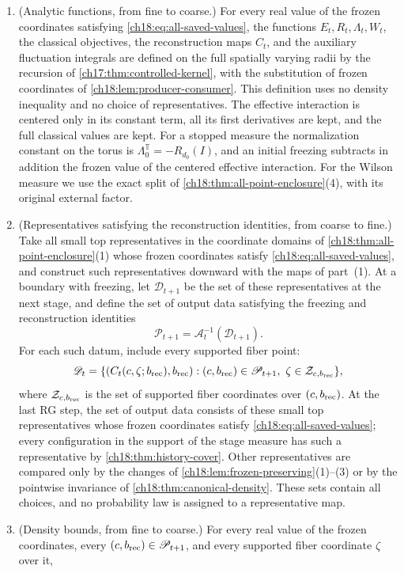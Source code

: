 \begin{theorem}
\begin{enumerate}
\item (Analytic functions, from fine to coarse.) For every real value of the frozen coordinates satisfying \eqref{ch18:eq:all-saved-values}, the functions $E_t,R_t,\Lambda_t,W_t$, the classical objectives, the reconstruction maps $C_t$, and the auxiliary fluctuation integrals are defined on the full spatially varying radii by the recursion of \cref{ch17:thm:controlled-kernel}, with the substitution of frozen coordinates of \cref{ch18:lem:producer-consumer}. This definition uses no density inequality and no choice of representatives. The effective interaction is centered only in its constant term, all its first derivatives are kept, and the full classical values are kept. For a stopped measure the normalization constant on the torus is $\Lambda_0^{\mathbb T}=-R_{d_0}(I)$, and an initial freezing subtracts in addition the frozen value of the centered effective interaction. For the Wilson measure we use the exact split of \cref{ch18:thm:all-point-enclosure}(4), with its original external factor.
\item (Representatives satisfying the reconstruction identities, from coarse to fine.) Take all small top representatives in the coordinate domains of \cref{ch18:thm:all-point-enclosure}(1) whose frozen coordinates satisfy \eqref{ch18:eq:all-saved-values}, and construct such representatives downward with the maps of part~(1). At a boundary with freezing, let $\mathscr D_{t+1}$ be the set of these representatives at the next stage, and define the set of output data satisfying the freezing and reconstruction identities
\[
 \mathscr P_{t+1}=\mathcal A_t^{-1}(\mathscr D_{t+1}).
\]
For each such datum, include every supported fiber point:
\[
 \mathscr D_t=
 \{(C_t(c,\zeta;b_{\mathrm{rec}}),b_{\mathrm{rec}}):
       (c,b_{\mathrm{rec}})\in\mathscr P_{t+1},\ \zeta\in\mathcal Z_{c,b_{\mathrm{rec}}}\},
\]
where $\mathcal Z_{c,b_{\mathrm{rec}}}$ is the set of supported fiber coordinates over $(c,b_{\mathrm{rec}})$.
At the last RG step, the set of output data consists of these small top representatives whose frozen coordinates satisfy \eqref{ch18:eq:all-saved-values}; every configuration in the support of the stage measure has such a representative by \cref{ch18:thm:history-cover}. Other representatives are compared only by the changes of \cref{ch18:lem:frozen-preserving}(1)--(3) or by the pointwise invariance of \cref{ch18:thm:canonical-density}. These sets contain all choices, and no probability law is assigned to a representative map.
\item (Density bounds, from fine to coarse.) For every real value of the frozen coordinates, every $(c,b_{\mathrm{rec}})\in\mathscr P_{t+1}$, and every supported fiber coordinate $\zeta$ over it,

\end{enumerate}
\end{theorem}
